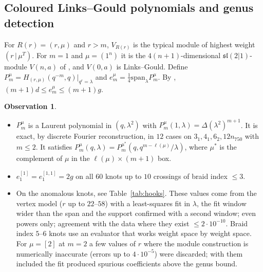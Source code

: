 \documentclass[11pt]{article}
\theoremstyle{definition}
\newtheorem{observation}[theorem]{Observation}
\theoremstyle{remark}
\begin{document}
\subsection{Coloured Links--Gould polynomials and genus detection}
For $R(r)=(r,\mu)$ and $r>m$, $V_{R(r)}$ is the typical module of highest weight $(r\,|\,\mu^T)$.  For $m=1$ and
$\mu=(1^n)$ it is the $4(n+1)$-dimensional $\mathfrak{sl}(2|1)$-module $V(n,a)$ of \cite{LNG}, and $V(0,a)$ is
Links--Gould.  Define $P^\mu_m=H_{(r,\mu)}(q^{-m},q)|_{q^r=\lambda}$ and $e^\mu_m=\frac14\mathrm{span}_\lambda P^\mu_m$.
By \cite{LNG}, $(m+1)d\le e^\mu_m\le(m+1)g$.
\begin{observation}\label{obs:hooks}
\begin{itemize}
\item[(i)] $P^\mu_m$ is a Laurent polynomial in $(q,\lambda^2)$ with $P^\mu_m(1,\lambda)=\Delta(\lambda^2)^{m+1}$.
It is exact, by discrete Fourier reconstruction, in $12$ cases on $3_1,4_1,6_2,12n_{750}$ with $m\le2$.
It satisfies $P^\mu_m(q,\lambda)=P^{\mu^*}_m(q,q^{m-\ell(\mu)}/\lambda)$, where $\mu^*$ is the complement of $\mu$ in
the $\ell(\mu)\times(m+1)$ box.
\item[(ii)] $e^{[1]}_1=e^{[1,1]}_1=2g$ on all $60$ knots up to $10$ crossings of braid index $\le3$.
\item[(iii)] On the anomalous knots, see Table~\ref{tab:hooks}.  These values come from the vertex model
($r$ up to $22$--$58$) with a least-squares fit in $\lambda$, the fit window wider than the span and the support
confirmed with a second window; even powers only; agreement with the data where they exist $\le2\cdot10^{-10}$.
Braid index $5$--$6$ knots use an evaluator that works weight space by weight space.  For $\mu=[2]$ at $m=2$ a few
values of $r$ where the module construction is numerically inaccurate (errors up to $4\cdot10^{-5}$) were
discarded; with them included the fit produced spurious coefficients above the genus bound.
\end{itemize}
\end{observation}
\end{document}
